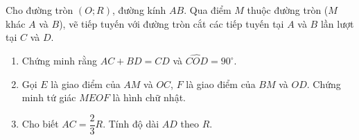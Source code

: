 \begin{bt}%
	Cho đường tròn $(O;R)$, đường kính $AB$. Qua điểm $M$ thuộc đường tròn ($M$ khác $A$ và $B$), vẽ tiếp tuyến với đường tròn cắt các tiếp tuyến tại $A$ và $B$ lần lượt tại $C$ và $D$.
	\begin{enumerate}
		\item Chứng minh rằng $AC+BD=CD$ và $\widehat{COD}=90^\circ$.
		\item Gọi $E$ là giao điểm của $AM$ và $OC$, $F$ là giao điểm của $BM$ và $OD$. Chứng minh tứ giác $MEOF$ là hình chữ nhật.
		\item Cho biết $AC=\dfrac{2}{3}R$. Tính độ dài $AD$ theo $R$.
	\end{enumerate}
\end{bt}
